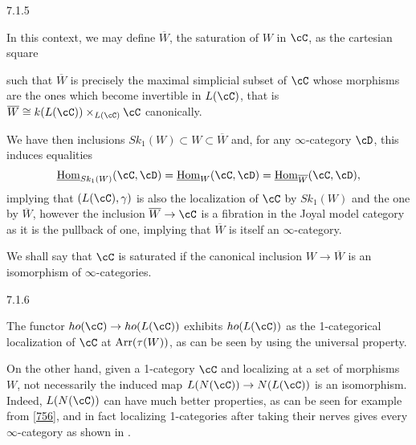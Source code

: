 \begin{rmk}\label{715}
  7.1.5

  In this context, we may define $\overline{W}$, the saturation of $W$ in $\cC$,
  as the cartesian square

  such that $\overline{W}$ is precisely the maximal simplicial subset of $\cC$
  whose morphisms are the ones which become invertible in $L(\cC)$, that is
  $\overline{W}\cong k(L(\cC))\times_{L(\cC)}\cC$ canonically.

  We have then inclusions $Sk_1(W)\subset W\subset\overline{W}$ and, for any
  $\infty$-category $\cD$, this induces equalities
  \[\home_{Sk_1(W)}(\cC,\cD)=\home_{W}(\cC,\cD)=\home_{\overline{W}}(\cC,\cD),\]
  implying that $(L(\cC),\gamma)$ is also the localization of $\cC$ by $Sk_1(W)$
  and the one by $\overline{W}$, however the inclusion
  $\overline{W}\rightarrow\cC$ is a fibration in the Joyal model category as it
  is the pullback of one, implying that $\overline{W}$ is itself an
  $\infty$-category.

  We shall say that $\cC$ is saturated if the canonical inclusion
  $W\rightarrow\overline{W}$ is an isomorphism of $\infty$-categories.
\end{rmk}

\begin{rmk}
  7.1.6

  The functor $ho(\cC)\rightarrow ho(L(\cC))$ exhibits $ho(L(\cC))$ as the
  1-categorical localization of $\cC$ at $\operatorname{Arr}(\tau(W))$, as can be seen by
  using the universal property.

  On the other hand, given a 1-category $\cC$ and localizing at a set of
  morphisms $W$, not necessarily the induced map $L(N(\cC))\rightarrow
  N(L(\cC))$ is an isomorphism. Indeed, $L(N(\cC))$ can have much better
  properties, as can be seen for example from \ref{756}, and in fact localizing
  1-categories after taking their nerves gives every $\infty$-category as shown
  in \cite[Prop.\ 7.3.15]{Cis19}.
\end{rmk}


